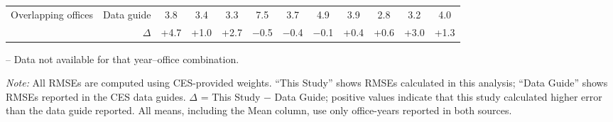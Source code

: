 \begin{table}[p]
{\begin{threeparttable}
\begin{tabular}{lrcccccccccc}
Overlapping offices & Data guide & 3.8 & 3.4 & 3.3 & 7.5 & 3.7 & 4.9 & 3.9 & 2.8 & 3.2 & 4.0 \\
 & $\Delta$ & +4.7 & +1.0 & +2.7 & $-$0.5 & $-$0.4 & $-$0.1 & +0.4 & +0.6 & +3.0 & +1.3 \\
\bottomrule
\end{tabular}
\begin{tablenotes}
\footnotesize
\item -- Data not available for that year--office combination.
\item \textit{Note:} All RMSEs are computed using CES-provided weights. ``This Study'' shows RMSEs calculated in this analysis; ``Data Guide'' shows RMSEs reported in the CES data guides. $\Delta$ = This Study $-$ Data Guide; positive values indicate that this study calculated higher error than the data guide reported. All means, including the Mean column, use only office-years reported in both sources.
\end{tablenotes}
\end{threeparttable}%
}
\end{table}
